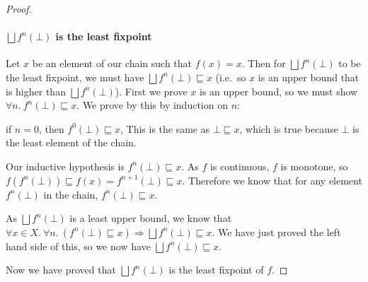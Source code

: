 \begin{proof}
\paragraph{$\bigsqcup f^n (\bot)$ is the least fixpoint}
Let $x$ be an element of our chain such that $f(x) = x$. Then for $\bigsqcup f^n (\bot)$ to be the least fixpoint, we must have $\bigsqcup f^n (\bot) \sqsubseteq x$ (i.e.\ so $x$ is an upper bound that is higher than $\bigsqcup f^n (\bot)$). First we prove $x$ is an upper bound, so  we must show $\forall n. \ f^n(\bot) \sqsubseteq x$. We prove by this by induction on $n$:

if $n = 0$, then $f^0(\bot) \sqsubseteq x$, This is the same as $\bot \sqsubseteq x$, which is true because $\bot$ is the least element of the chain.

Our inductive hypothesis is $f^n(\bot) \sqsubseteq x$. As $f$ is continuous, $f$ is monotone, so $f(f^n(\bot)) \sqsubseteq f(x) = f^{n+1}(\bot) \sqsubseteq x$. Therefore we know that for any element $f^n(\bot)$ in the chain, $f^n(\bot) \sqsubseteq x$. 

As $\bigsqcup f^n (\bot)$ is a least upper bound, we know that  $\forall x \in X. \  \forall n. \ (f^n(\bot) \sqsubseteq x) \Rightarrow \bigsqcup f^n (\bot) \sqsubseteq x$. We have just proved the left hand side of this, so we now have $\bigsqcup f^n (\bot) \sqsubseteq x$.

\vspace{0.5cm}

Now we have proved that $\bigsqcup f^n (\bot)$ is the least fixpoint of $f$.
\end{proof}